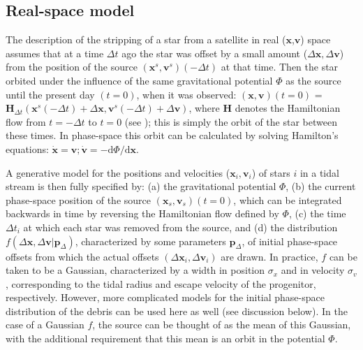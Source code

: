 \documentclass[12pt,preprint]{aastex}
\newcommand{\dd}{\mathrm{d}}
\renewcommand{\vec}[1]{\ensuremath{\mathbf{#1}}}
\newcommand{\vecx}{\ensuremath{\vec{x}}}
\newcommand{\vecv}{\ensuremath{\vec{v}}}
\newcommand{\vech}{\ensuremath{\vec{H}}}
\newcommand{\paramsdiff}{\ensuremath{\vec{p}_\Delta}}
\begin{document}
\subsection{Real-space model}\label{sec:realmethod}

The description of the stripping of a star from a satellite in real
(\vecx,\vecv) space assumes that at a time $\Delta t$ ago the star was
offset by a small amount ($\Delta \vecx,\Delta \vecv$) from the
position of the source $(\vecx^s,\vecv^s)(-\Delta t)$ at that
time. Then the star orbited under the influence of the same
gravitational potential $\Phi$ as the source until the present day
$(t=0)$, when it was observed: $(\vecx,\vecv)(t=0)$ = $\vech_{\Delta
  t}(\vecx^s(-\Delta t)+\Delta \vecx,\vecv^s(-\Delta t)+\Delta
\vecv)$, where $\vech$ denotes the Hamiltonian flow from $t=-\Delta t$
to $t=0$ (see \citealt{binneytremaine}); this is simply the orbit of
the star between these times. In phase-space this orbit can be
calculated by solving Hamilton's equations: $\dot{\vecx} = \vecv;
\dot{\vecv} = - \dd \Phi / \dd \vecx$. 

A generative model for the positions and velocities
($\vecx_i,\vecv_i$) of stars $i$ in a tidal stream is then fully
specified by: (a) the gravitational potential $\Phi$, (b) the current
phase-space position of the source $(\vecx_s,\vecv_s)(t=0)$, which can
be integrated backwards in time by reversing the Hamiltonian flow
defined by $\Phi$, (c) the time $\Delta t_i$ at which each star was
removed from the source, and (d) the distribution $f(\Delta
\vecx,\Delta \vecv|\paramsdiff)$, characterized by some parameters
$\paramsdiff$, of initial phase-space offsets from which the actual
offsets $(\Delta \vecx_i,\Delta \vecv_i)$ are drawn. In practice, $f$
can be taken to be a Gaussian, characterized by a width in position
$\sigma_x$ and in velocity $\sigma_v$, corresponding to the tidal
radius and escape velocity of the progenitor, respectively. However,
more complicated models for the initial phase-space distribution of
the debris can be used here as well (see discussion below). In the
case of a Gaussian $f$, the source can be thought of as the mean of
this Gaussian, with the additional requirement that this mean is an
orbit in the potential $\Phi$.
\end{document}
